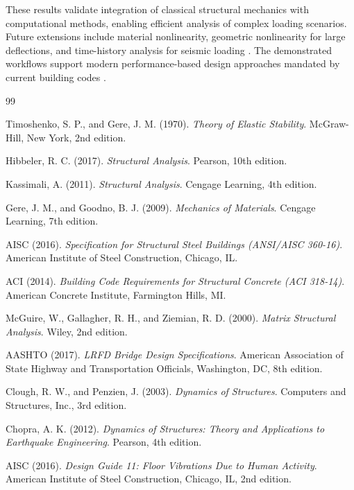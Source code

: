 \documentclass[11pt,a4paper]{article}
\begin{document}
These results validate integration of classical structural mechanics with computational methods, enabling efficient analysis of complex loading scenarios. Future extensions include material nonlinearity, geometric nonlinearity for large deflections, and time-history analysis for seismic loading \cite{chopra2012dynamics}. The demonstrated workflows support modern performance-based design approaches mandated by current building codes \cite{asce2017seismic}.


\begin{thebibliography}{99}

Timoshenko, S. P., and Gere, J. M. (1970). \textit{Theory of Elastic Stability}. McGraw-Hill, New York, 2nd edition.

Hibbeler, R. C. (2017). \textit{Structural Analysis}. Pearson, 10th edition.

Kassimali, A. (2011). \textit{Structural Analysis}. Cengage Learning, 4th edition.

Gere, J. M., and Goodno, B. J. (2009). \textit{Mechanics of Materials}. Cengage Learning, 7th edition.

AISC (2016). \textit{Specification for Structural Steel Buildings (ANSI/AISC 360-16)}. American Institute of Steel Construction, Chicago, IL.

ACI (2014). \textit{Building Code Requirements for Structural Concrete (ACI 318-14)}. American Concrete Institute, Farmington Hills, MI.

McGuire, W., Gallagher, R. H., and Ziemian, R. D. (2000). \textit{Matrix Structural Analysis}. Wiley, 2nd edition.

AASHTO (2017). \textit{LRFD Bridge Design Specifications}. American Association of State Highway and Transportation Officials, Washington, DC, 8th edition.

Clough, R. W., and Penzien, J. (2003). \textit{Dynamics of Structures}. Computers and Structures, Inc., 3rd edition.

Chopra, A. K. (2012). \textit{Dynamics of Structures: Theory and Applications to Earthquake Engineering}. Pearson, 4th edition.

AISC (2016). \textit{Design Guide 11: Floor Vibrations Due to Human Activity}. American Institute of Steel Construction, Chicago, IL, 2nd edition.


\end{thebibliography}
\end{document}
